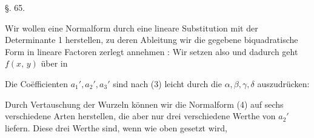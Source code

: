 
\begin{center}
§. 65.

\end{center}

Wir wollen eine Normalform durch eine lineare Substitution
mit der Determinante 1 herstellen, zu deren Ableitung wir die
gegebene biquadratische Form in lineare Factoren zerlegt annehmen
:
Wir setzen
also
und dadurch geht $f(x,\,y)$ über in

Die Coëfficienten $a_1', a_2', a_3'$ sind nach (3) leicht durch die
$\alpha, \beta, \gamma, \delta$ auszudrücken:

Durch Vertauschung der Wurzeln können wir die Normalform
 (4) auf sechs verschiedene Arten herstellen, die aber nur
drei verschiedene Werthe von $a_2'$ liefern. Diese drei Werthe
sind, wenn wie oben
gesetzt wird,
